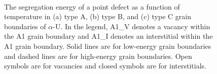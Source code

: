 \documentclass[review]{elsarticle}
\begin{document}
\begin{figure}[h!]
\centering
{}
\\
\caption{The segregation energy of a point defect as a function of temperature in (a) type A, (b) type B, and (c) type C grain boundaries of $\alpha$-U. In the legend, A1\_V denotes a vacancy within the A1 grain boundary and A1\_I denotes an interstitial within the A1 grain boundary. Solid lines are for low-energy grain boundaries and dashed lines are for high-energy grain boundaries. Open symbols are for vacancies and closed symbols are for interstitials.}
\label{fig:Seg}
\end{figure}
\end{document}
